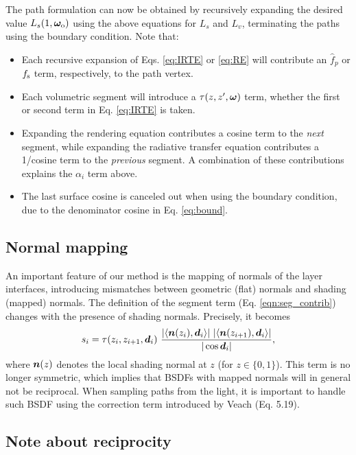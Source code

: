 The path formulation can now be obtained by recursively expanding the desired value $L_s(1, \bm\omega_\mathrm{o})$ using the above equations for $L_s$ and $L_v$, terminating the paths using the boundary condition. Note that:
\begin{itemize}
	\item Each recursive expansion of Eqs. \eqref{eq:IRTE} or \eqref{eq:RE} will contribute an $\hat f_p$ or $f_\mathrm{s}$ term, respectively, to the path vertex.
	\item Each volumetric segment will introduce a $\tau(z, z', \bm\omega)$ term, whether the first or second term in Eq. \eqref{eq:IRTE} is taken.
	\item{Expanding the rendering equation contributes a cosine term to the \emph{next} segment, while expanding the radiative transfer equation contributes a 1/cosine term to the \emph{previous} segment. A combination of these contributions explains the $\alpha_i$ term above.}
	\item The last surface cosine is canceled out when using the boundary condition, due to the denominator cosine in Eq. \eqref{eq:bound}.
\end{itemize}


\subsection{Normal mapping}

An important feature of our method is the mapping of normals of the layer interfaces, introducing mismatches between geometric (flat) normals and shading (mapped) normals. The definition of the segment term (Eq. \eqref{eqn:seg_contrib}) changes with the presence of shading normals. Precisely, it becomes
\begin{equation}
s_i = \tau(z_i, z_{i+1}, \bmd_i) \ \frac{|\EV{\bmn(z_i),\bmd_i}| \ |\EV{\bmn(z_{i + 1}),\bmd_i}|}{|\cos \bmd_i|},
\end{equation}
where $\bm{n}(z)$ denotes the local shading normal at $z$ (for $z \in \{0, 1\}$). This term is no longer symmetric, which implies that BSDFs with mapped normals will in general not be reciprocal. When sampling paths from the light, it is important to handle such BSDF using the correction term introduced by Veach \cite{veach1997robust} (Eq. 5.19).


\subsection{Note about reciprocity}

